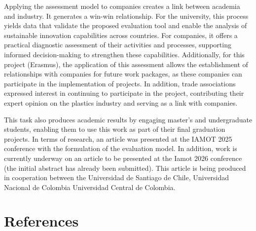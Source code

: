 \documentclass[
  12pt,
  oneside]{book}
\begin{document}
Applying the assessment model to companies creates a link between
academia and industry. It generates a win-win relationship. For the
university, this process yields data that validate the proposed
evaluation tool and enable the analysis of sustainable innovation
capabilities across countries. For companies, it offers a practical
diagnostic assessment of their activities and processes, supporting
informed decision-making to strengthen these capabilities. Additionally,
for this project (Erasmus), the application of this assessment allows
the establishment of relationships with companies for future work
packages, as these companies can participate in the implementation of
projects. In addition, trade associations expressed interest in
continuing to participate in the project, contributing their expert
opinion on the plastics industry and serving as a link with companies.

This task also produces academic results by engaging master's and
undergraduate students, enabling them to use this work as part of their
final graduation projects. In terms of research, an article was
presented at the IAMOT 2025 conference with the formulation of the
evaluation model. In addition, work is currently underway on an article
to be presented at the Iamot 2026 conference (the initial abstract has
already been submitted). This article is being produced in cooperation
between the Universidad de Santiago de Chile, Universidad Nacional de
Colombia Universidad Central de Colombia.

\chapter{References}\label{references}
\end{document}
